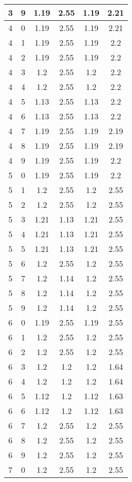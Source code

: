 \begin{longtable}{|c|c||c||c||c|c|}
	3 & 9 & 1.19 & 2.55 & 1.19 & 2.21 \\ \hline
	4 & 0 & 1.19 & 2.55 & 1.19 & 2.21 \\ \hline
	4 & 1 & 1.19 & 2.55 & 1.19 & 2.2 \\ \hline
	4 & 2 & 1.19 & 2.55 & 1.19 & 2.2 \\ \hline
	4 & 3 & 1.2 & 2.55 & 1.2 & 2.2 \\ \hline
	4 & 4 & 1.2 & 2.55 & 1.2 & 2.2 \\ \hline
	4 & 5 & 1.13 & 2.55 & 1.13 & 2.2 \\ \hline
	4 & 6 & 1.13 & 2.55 & 1.13 & 2.2 \\ \hline
	4 & 7 & 1.19 & 2.55 & 1.19 & 2.19 \\ \hline
	4 & 8 & 1.19 & 2.55 & 1.19 & 2.19 \\ \hline
	4 & 9 & 1.19 & 2.55 & 1.19 & 2.2 \\ \hline
	5 & 0 & 1.19 & 2.55 & 1.19 & 2.2 \\ \hline
	5 & 1 & 1.2 & 2.55 & 1.2 & 2.55 \\ \hline
	5 & 2 & 1.2 & 2.55 & 1.2 & 2.55 \\ \hline
	5 & 3 & 1.21 & 1.13 & 1.21 & 2.55 \\ \hline
	5 & 4 & 1.21 & 1.13 & 1.21 & 2.55 \\ \hline
	5 & 5 & 1.21 & 1.13 & 1.21 & 2.55 \\ \hline
	5 & 6 & 1.2 & 2.55 & 1.2 & 2.55 \\ \hline
	5 & 7 & 1.2 & 1.14 & 1.2 & 2.55 \\ \hline
	5 & 8 & 1.2 & 1.14 & 1.2 & 2.55 \\ \hline
	5 & 9 & 1.2 & 1.14 & 1.2 & 2.55 \\ \hline
	6 & 0 & 1.19 & 2.55 & 1.19 & 2.55 \\ \hline
	6 & 1 & 1.2 & 2.55 & 1.2 & 2.55 \\ \hline
	6 & 2 & 1.2 & 2.55 & 1.2 & 2.55 \\ \hline
	6 & 3 & 1.2 & 1.2 & 1.2 & 1.64 \\ \hline
	6 & 4 & 1.2 & 1.2 & 1.2 & 1.64 \\ \hline
	6 & 5 & 1.12 & 1.2 & 1.12 & 1.63 \\ \hline
	6 & 6 & 1.12 & 1.2 & 1.12 & 1.63 \\ \hline
	6 & 7 & 1.2 & 2.55 & 1.2 & 2.55 \\ \hline
	6 & 8 & 1.2 & 2.55 & 1.2 & 2.55 \\ \hline
	6 & 9 & 1.2 & 2.55 & 1.2 & 2.55 \\ \hline
	7 & 0 & 1.2 & 2.55 & 1.2 & 2.55 \\ \hline

\end{longtable}
